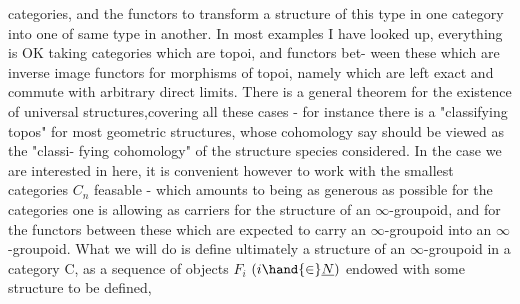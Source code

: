 categories,  and the functors to transform a structure of this type in one
category into one of same type in another.  In most examples I have looked
up,  everything is OK taking categories which are topoi, and functors bet-%
ween these which are inverse image functors for morphisms of topoi, namely
which are left exact and commute with arbitrary direct limits.  There is a
general theorem for the existence of universal structures,covering all
these cases  -  for instance there is a "classifying topos" for most 
geometric structures,  whose cohomology say should be viewed as the "classi-%
fying cohomology" of the structure species considered.  In the case we are
interested in here,  it is convenient however to work with the smallest
categories $C_n$ feasable  -  which amounts to being as generous as possible
for the categories   one is allowing  as carriers for the
structure of an $\infty$-groupoid,  and for the functors between these which are
expected to carry an $\infty$-groupoid into an $\infty$-groupoid.  What we will do is
define ultimately a structure of an $\infty$-groupoid in a category C,  as a
sequence of objects $F_i$ $(i\hand{\in} \underline{N})$ \hand{\unsure{,}} endowed with some structure to be defined,

